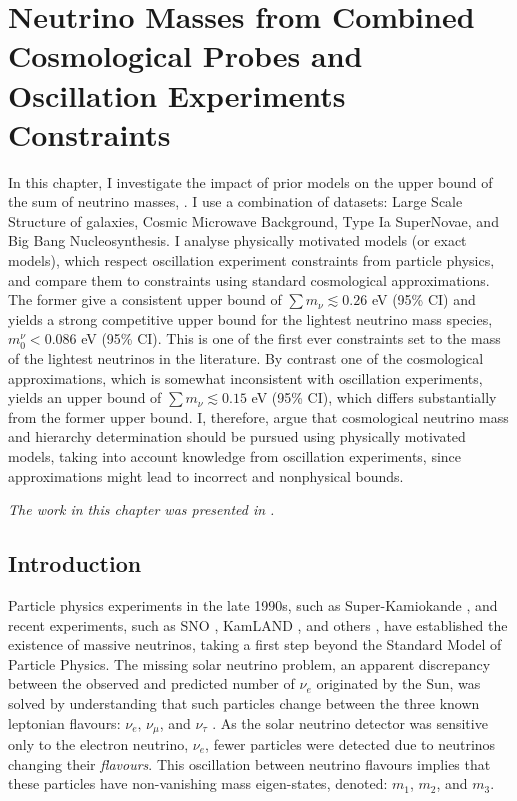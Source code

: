 %
\chapter{Neutrino Masses from Combined Cosmological Probes and Oscillation Experiments Constraints}
\label{Chap:Neutrinos}


\vspace*{\fill}

In this chapter, I investigate the impact of prior models on the upper bound of the sum of neutrino masses, \NM{}. I use a combination of datasets: Large Scale Structure of galaxies, Cosmic Microwave Background, Type Ia SuperNovae, and Big Bang Nucleosynthesis. I analyse physically motivated models (or exact models), which respect oscillation experiment constraints from particle physics, and compare them to constraints using standard cosmological approximations. The former give a consistent upper bound of $\sum m_{\nu} \lesssim 0.26$ eV (95\% CI) and yields a strong competitive upper bound for the lightest neutrino mass species, $m_0^{\nu} < 0.086$ eV (95\% CI). This is one of the first ever constraints set to the mass of the lightest neutrinos in the literature. By contrast one of the cosmological approximations, which is somewhat inconsistent with oscillation experiments, yields an upper bound of $\sum m_{\nu} \lesssim 0.15$ eV (95\% CI), which differs substantially from the former upper bound. I, therefore, argue that cosmological neutrino mass and hierarchy determination should be pursued using physically motivated models, taking into account knowledge from oscillation experiments, since approximations might lead to incorrect and nonphysical bounds.

\textit{The work in this chapter was presented in \citet{2018LoureiroNeutrinos}.} 

\newpage
\section{Introduction}
Particle physics experiments in the late 1990s, such as Super-Kamiokande \citep{Kamiokande1998}, and recent experiments, such as SNO \citep{2002SNO}, KamLAND \citep{2005KamLAND}, and others \citep{2008MINOS,2012RENOExperiment,AbeNeutrino2014}, have established the existence of massive neutrinos, taking a first step beyond the Standard Model of Particle Physics. The missing solar neutrino problem, an apparent discrepancy between the observed and predicted number of $\nu_e$ originated by the Sun, was solved by understanding that such particles change between the three known leptonian flavours: $\nu_e, \, \nu_{\mu}$, and $\nu_{\tau}$ \citep{2016Capozzi}. As the solar neutrino detector was sensitive only to the electron neutrino, $\nu_e$, fewer particles were detected due to neutrinos changing their \textit{flavours}. This oscillation between neutrino flavours implies that these particles have non-vanishing mass eigen-states, denoted: $m_1$, $m_2$, and $m_3$. 

